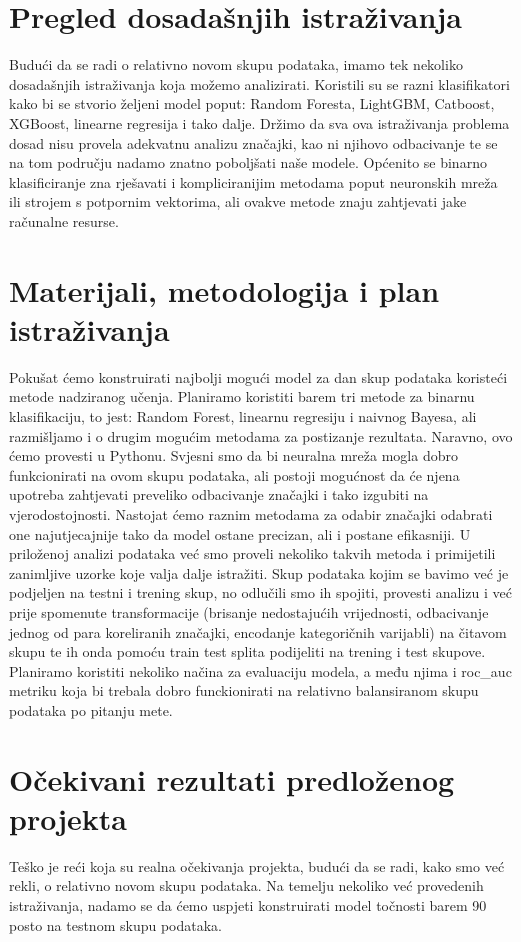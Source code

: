 \documentclass[a4paper,12pt]{article}
\begin{document}
\section{Pregled dosadašnjih istraživanja}
Budući da se radi o relativno novom skupu podataka, imamo tek nekoliko dosadašnjih istraživanja koja možemo analizirati. Koristili su se razni klasifikatori kako bi se stvorio željeni model poput: Random Foresta, LightGBM, Catboost, XGBoost, linearne regresija i tako dalje. Držimo da sva ova istraživanja problema dosad nisu provela adekvatnu analizu značajki, kao ni njihovo odbacivanje te se na tom području nadamo znatno poboljšati naše modele. Općenito se binarno klasificiranje zna rješavati i kompliciranijim metodama poput neuronskih mreža ili strojem s potpornim vektorima, ali ovakve metode znaju zahtjevati jake računalne resurse.

\section{Materijali, metodologija i plan istraživanja}
Pokušat ćemo konstruirati najbolji mogući model za dan skup podataka koristeći metode nadziranog učenja. Planiramo koristiti barem tri metode za binarnu klasifikaciju, to jest: Random Forest, linearnu regresiju i naivnog Bayesa, ali razmišljamo i o drugim mogućim metodama za postizanje rezultata. Naravno, ovo ćemo provesti u Pythonu. Svjesni smo da bi neuralna mreža mogla dobro funkcionirati na ovom skupu podataka, ali postoji mogućnost da će njena upotreba zahtjevati preveliko odbacivanje značajki i tako izgubiti na vjerodostojnosti. Nastojat ćemo raznim metodama za odabir značajki odabrati one najutjecajnije tako da model ostane precizan, ali i postane efikasniji. U priloženoj analizi podataka već smo proveli nekoliko takvih metoda i primijetili zanimljive uzorke koje valja dalje istražiti. Skup podataka kojim se bavimo već je podjeljen na testni i trening skup, no odlučili smo ih spojiti, provesti analizu i već prije spomenute transformacije (brisanje nedostajućih vrijednosti, odbacivanje jednog od para koreliranih značajki, encodanje kategoričnih varijabli) na čitavom skupu te ih onda pomoću train test splita podijeliti na trening i test skupove. Planiramo koristiti nekoliko načina za evaluaciju modela, a među njima i roc\_auc metriku koja bi trebala dobro funckionirati na relativno balansiranom skupu podataka po pitanju mete.

\section{Očekivani rezultati predloženog projekta}
Teško je reći koja su realna očekivanja projekta, budući da se radi, kako smo već rekli, o relativno novom skupu podataka. Na temelju nekoliko već provedenih istraživanja, nadamo se da ćemo uspjeti konstruirati model točnosti barem 90 posto na testnom skupu podataka.
\end{document}
